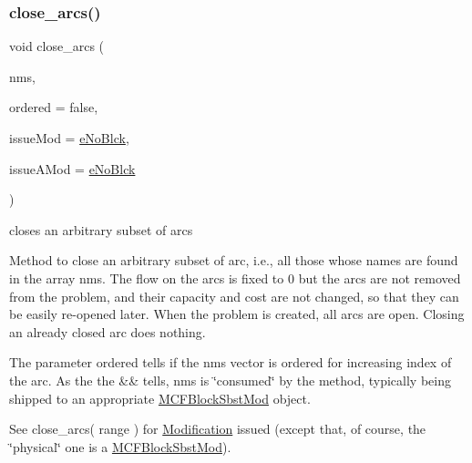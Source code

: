\subsubsection{\texorpdfstring{close\+\_\+arcs()}{close\_arcs()}\hspace{0.1cm}{\footnotesize\ttfamily [2/2]}}
{\footnotesize\ttfamily void close\+\_\+arcs (\begin{DoxyParamCaption}\item[{\mbox{\hyperlink{class_s_m_spp__di__unipi__it_1_1_m_c_f_block_a9a1284953e2aa5222b5867c0a7f98499}{Vec\+\_\+\+Index}} \&\&}]{nms,  }\item[{const bool}]{ordered = {\ttfamily false},  }\item[{\mbox{\hyperlink{group___modification___t_y_p_e_s_ga544246d8c462e9a2d817c2c30797968f}{c\+\_\+\+Mod\+Param}}}]{issue\+Mod = {\ttfamily \mbox{\hyperlink{group___modification___t_y_p_e_s_gga48fddcdd03a03f49b7e389ca1ed938d4ada69e89c5f46e563d8a13cfa6830c136}{e\+No\+Blck}}},  }\item[{\mbox{\hyperlink{group___modification___t_y_p_e_s_ga544246d8c462e9a2d817c2c30797968f}{c\+\_\+\+Mod\+Param}}}]{issue\+A\+Mod = {\ttfamily \mbox{\hyperlink{group___modification___t_y_p_e_s_gga48fddcdd03a03f49b7e389ca1ed938d4ada69e89c5f46e563d8a13cfa6830c136}{e\+No\+Blck}}} }\end{DoxyParamCaption})}



closes an arbitrary subset of arcs 

Method to close an arbitrary subset of arc, i.\+e., all those whose names are found in the array nms. The flow on the arcs is fixed to 0 but the arcs are not removed from the problem, and their capacity and cost are not changed, so that they can be easily re-\/opened later. When the problem is created, all arcs are open. Closing an already closed arc does nothing.

The parameter ordered tells if the nms vector is ordered for increasing index of the arc. As the the \&\& tells, nms is \char`\"{}consumed\char`\"{} by the method, typically being shipped to an appropriate \mbox{\hyperlink{class_s_m_spp__di__unipi__it_1_1_m_c_f_block_sbst_mod}{M\+C\+F\+Block\+Sbst\+Mod}} object.

See close\+\_\+arcs( range ) for \mbox{\hyperlink{class_s_m_spp__di__unipi__it_1_1_modification}{Modification}} issued (except that, of course, the \char`\"{}physical\char`\"{} one is a \mbox{\hyperlink{class_s_m_spp__di__unipi__it_1_1_m_c_f_block_sbst_mod}{M\+C\+F\+Block\+Sbst\+Mod}}). \mbox{\label{class_s_m_spp__di__unipi__it_1_1_m_c_f_block_a7c6d8d4ff78950993ded5d1abfd4fe53}} 
